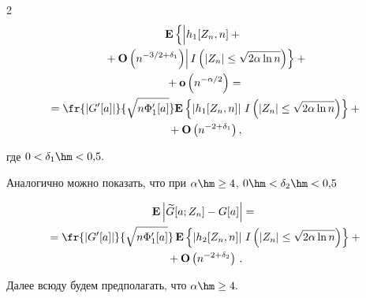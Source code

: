 \begin{multicols}{2}
\begin{multline}
 \mathbf{E}\left\{


 \left|


 \vphantom{\mathbf{O}\left(n^{-3/2+\delta_1}\right)}


 h_1[Z_n,n]+{}\right.\right.\\


\left.\left. {}+\mathbf{O}\left(n^{-3/2+\delta_1}\right)\right|


 I\left( \left| Z_n \right| \le \sqrt {2\alpha \ln n} \right) \right\}+{}\\


 {}+


 \mathbf{o}\left(n^{-\alpha/2}\right)={}


\\


 {}=\fr{|G'[a]|}{\sqrt {n\Phi'_1[a]}}


 \mathbf{E}\left\{\left|h_1[Z_n,n]\right|\,


 I\left( |Z_n|\le \sqrt {2\alpha \ln n}\right) \right\}+{}\\


 {}+


 \mathbf{O}\left(n^{-2+\delta_1}\right),


  \label{e23-ch}


 \end{multline}


 где $0<\delta_1\hm<0{,}5.$





 Аналогично можно показать, что при $\alpha\hm\ge 4$, $0\hm<\delta_2\hm<0{,}5$


 \begin{multline}


 \mathbf{E}\left|\widetilde{G}[a;Z_n]-G[a]\right|={}


\\


{}=\fr{|G'[a]|}{\sqrt {n\Phi'_1[a]}}\,


 \mathbf{E}\left\{\left|h_2[Z_n,n]\right|\,I\left( |Z_n|\le 


 \sqrt {2\alpha \ln n}\right) \right\}+{}\\


 {}+\mathbf{O}\left(n^{-2+\delta_2}\right)\,.


 \label{e24-ch}


 \end{multline}





 Далее всюду будем предполагать, что $\alpha\hm\ge 4.$






\end{multicols}
